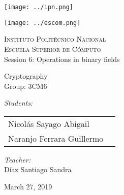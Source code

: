 \documentclass[12pt]{article}
\author{Reporte 1}
\begin{document}
		\begin{titlepage}
			\begin{center}
				
				
				\noindent
				\begin{minipage}{0.5\textwidth}
					\begin{flushleft} \large
						\texttt{[image: ../ipn.png]}
					\end{flushleft}
				\end{minipage}%
				\begin{minipage}{0.55\textwidth}
					\begin{flushright} \large
						\texttt{[image: ../escom.png]}
					\end{flushright}
				\end{minipage}
				
				\textsc{\LARGE Instituto Politécnico Nacional}\\[0.5cm]
				
				\textsc{\Large Escuela Superior de Cómputo}\\[1cm]
				
				
				{ \huge Session 6: Operations in binary fields \\[1cm] }
				
				{ \Large Cryptography} \\[1cm]
				
				{ \Large Group: 3CM6 } \\[1cm]
				
				\noindent
				\begin{minipage}{0.5\textwidth}
					\begin{flushleft} \large
						\emph{Students:}\\
						
						\begin{tabular}{ll}
					     Nicolás Sayago Abigail\\
					     Naranjo Ferrara Guillermo\\
					     
					\end{tabular}
					\end{flushleft}
				\end{minipage}%
				\begin{minipage}{0.5\textwidth}
					\begin{flushright} \large
						\emph{Teacher:} \\
						Díaz Santiago Sandra  \\
					\end{flushright}
				\end{minipage}
				
				\vfill
				
				{\large March 27, 2019}
			\end{center}
		\end{titlepage}
	
\end{document}

